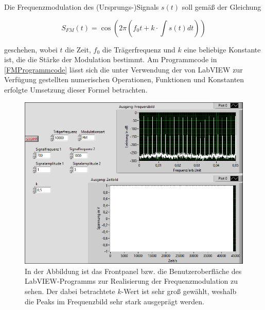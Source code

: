 \documentclass[
a4paper,
12pt,
pagesize,
ngerman
]{scrartcl}
\begin{document}
	Die Frequenzmodulation des (Ursprungs-)Signals $s(t)$ soll gemäß der Gleichung
	
	\begin{equation} \label{FMFormel}
	S_{FM}(t) = \cos (2\pi (f_0 t + k \cdot \int s(t) dt))
	\end{equation}
	
	\noindent geschehen, wobei $t$ die Zeit, $f_0$ die Trägerfrequenz und $k$ eine beliebige Konstante ist, die die Stärke der Modulation bestimmt. 
	Am Programmcode in \cref{FMProgrammcode} lässt sich die unter Verwendung der von LabVIEW zur Verfügung gestellten numerischen Operationen, Funktionen und Konstanten erfolgte Umsetzung dieser Formel betrachten. 
	
	\begin{figure}[H]
		\centering
		\includegraphics[width=1.0\textwidth]{EIRE2018Dateien/Tag4/FMPM-Erzeugung/anderekbei10000Traegerfr/FM-FMPM-Erzeugungp}
		\caption{In der Abbildung ist das Frontpanel bzw. die Benutzeroberfläche des LabVIEW-Programms zur Realisierung der Frequenzmodulation zu sehen. Der dabei betrachtete $k$-Wert ist sehr groß gewählt, weshalb die Peaks im Frequenzbild sehr stark ausgeprägt werden.}
		\label{FMAusgabegrossesk}
	\end{figure}
	
\end{document}
